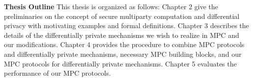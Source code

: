 
\textbf{Thesis Outline}
This thesis is organized as follows:
Chapter 2 give the preliminaries on the concept of secure multiparty computation and differential privacy with motivating examples and formal definitions.
Chapter 3 describes the details of the differentially private mechanisms we wish to realize in MPC and our modifications.
Chapter 4 provides the procedure to combine MPC protocols and differentially private mechanisms, necessary MPC building blocks, and our MPC protocols for differentially private mechanisms.
Chapter 5 evaluates the performance of our MPC protocols.



